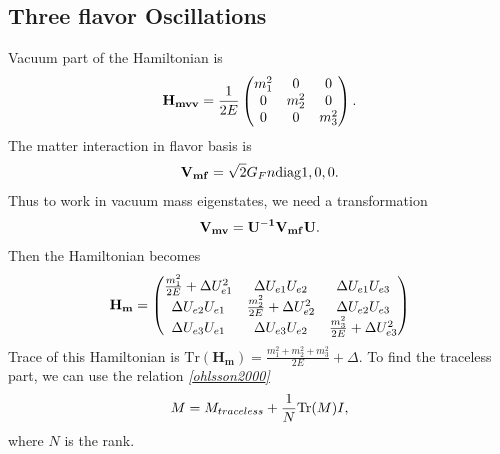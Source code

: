 \documentclass[letterpaper,12pt,english]{sphinxmanual}
\begin{document}
\subsection{Three flavor Oscillations}
\label{msw:three-flavor-oscillations}
Vacuum part of the Hamiltonian is
\begin{gather}
\begin{split}\mathbf{H_{mvv}} = \frac{1}{2E} \begin{pmatrix}
m_1^2 & 0 & 0 \\
0 & m_2^2 & 0 \\
0 & 0 & m_3^2
\end{pmatrix}.\end{split}\notag
\end{gather}
The matter interaction in flavor basis is
\begin{gather}
\begin{split}\mathbf{V_{mf}} = \sqrt{2}G_F n \mathrm{diag}{1,0,0}.\end{split}\notag
\end{gather}
Thus to work in vacuum mass eigenstates, we need a transformation
\begin{gather}
\begin{split}\mathbf{V_{mv}} = \mathbf{U^{-1}}\mathbf{V_{mf}} \mathbf{U}.\end{split}\notag
\end{gather}
Then the Hamiltonian becomes
\begin{gather}
\begin{split}\mathbf{H_{m}} = \begin{pmatrix}
\frac{m_1^2}{2E} + \Delta U_{e1}^2 & \Delta U_{e1} U_{e2} & \Delta U_{e1} U_{e3} \\
\Delta U_{e2} U_{e1} & \frac{m_2^2}{2E} + \Delta U_{e2}^2 & \Delta U_{e2} U_{e3} \\
\Delta U_{e3} U_{e1} & \Delta U_{e3} U_{e2} & \frac{m_3^2}{2E} + \Delta U_{e3}^2
\end{pmatrix}\end{split}\notag
\end{gather}
Trace of this Hamiltonian is \(\mathrm{Tr}(\mathbf{H_m}) = \frac{m_1^2+m_2^2+m_3^2}{2E}+\Delta\). To find the traceless part, we can use the relation \label{msw:id5}{\hyperref[msw:ohlsson2000]{\emph{{[}ohlsson2000{]}}}}
\begin{gather}
\begin{split}M = M_{traceless}+ \frac{1}{N} \mathrm{Tr}(M) I,\end{split}\notag
\end{gather}
where \(N\) is the rank.
\end{document}
